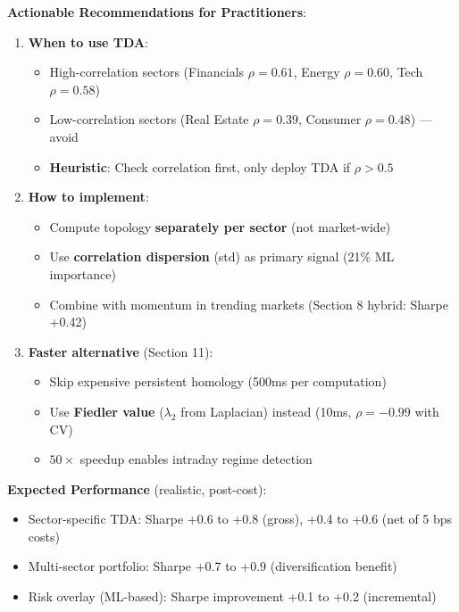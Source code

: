 \textbf{Actionable Recommendations for Practitioners}:

\begin{enumerate}
\item \textbf{When to use TDA}:
   \begin{itemize}
   \item High-correlation sectors (Financials $\rho = 0.61$, Energy $\rho = 0.60$, Tech $\rho = 0.58$)
   \item Low-correlation sectors (Real Estate $\rho = 0.39$, Consumer $\rho = 0.48$) --- avoid
   \item \textbf{Heuristic}: Check correlation first, only deploy TDA if $\rho > 0.5$
   \end{itemize}

\item \textbf{How to implement}:
   \begin{itemize}
   \item Compute topology \textbf{separately per sector} (not market-wide)
   \item Use \textbf{correlation dispersion} (std) as primary signal (21\% ML importance)
   \item Combine with momentum in trending markets (Section 8 hybrid: Sharpe +0.42)
   \end{itemize}

\item \textbf{Faster alternative} (Section 11):
   \begin{itemize}
   \item Skip expensive persistent homology (500ms per computation)
   \item Use \textbf{Fiedler value} ($\lambda_2$ from Laplacian) instead (10ms, $\rho = -0.99$ with CV)
   \item $50\times$ speedup enables intraday regime detection
   \end{itemize}
\end{enumerate}

\textbf{Expected Performance} (realistic, post-cost):
\begin{itemize}
\item Sector-specific TDA: Sharpe +0.6 to +0.8 (gross), +0.4 to +0.6 (net of 5 bps costs)
\item Multi-sector portfolio: Sharpe +0.7 to +0.9 (diversification benefit)
\item Risk overlay (ML-based): Sharpe improvement +0.1 to +0.2 (incremental)
\end{itemize}

